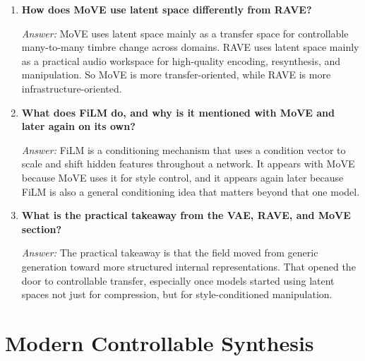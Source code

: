 \documentclass[11pt]{article}
\newcommand{\qa}[2]{
\item \textbf{#1}

\textit{Answer:} #2
}
\begin{document}
\begin{enumerate}[start=29]
\qa{How does MoVE use latent space differently from RAVE?}{
MoVE uses latent space mainly as a transfer space for controllable many-to-many timbre change across domains. RAVE uses latent space mainly as a practical audio workspace for high-quality encoding, resynthesis, and manipulation. So MoVE is more transfer-oriented, while RAVE is more infrastructure-oriented.
}

\qa{What does FiLM do, and why is it mentioned with MoVE and later again on its own?}{
FiLM is a conditioning mechanism that uses a condition vector to scale and shift hidden features throughout a network. It appears with MoVE because MoVE uses it for style control, and it appears again later because FiLM is also a general conditioning idea that matters beyond that one model.
}

\qa{What is the practical takeaway from the VAE, RAVE, and MoVE section?}{
The practical takeaway is that the field moved from generic generation toward more structured internal representations. That opened the door to controllable transfer, especially once models started using latent spaces not just for compression, but for style-conditioned manipulation.
}
\end{enumerate}

\section{Modern Controllable Synthesis}
\end{document}

